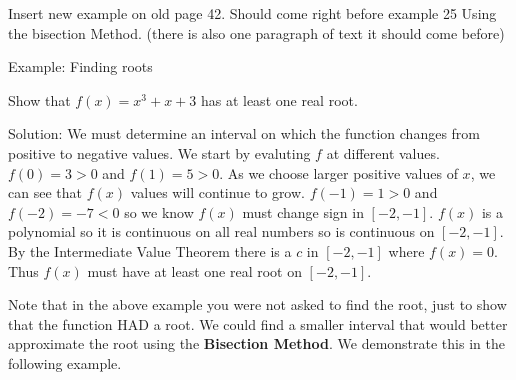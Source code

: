 \documentclass[10pt]{article}
\begin{document}
Insert new example on old page 42. Should come right before example 25 Using the bisection Method. (there is also one paragraph of text it should come before)

Example:  Finding roots

Show that $f(x)=x^3+x+3$ has at least one real root.

Solution:  We must determine an interval on which the function changes from positive to negative values. We start by evaluting $f$ at different values. $f(0)=3>0$ and $f(1)=5>0$. As we choose larger positive values of $x$, we can see that $f(x)$ values will continue to grow. $f(-1)=1>0$ and $f(-2)=-7<0$ so we know $f(x)$ must change sign in $[-2,-1]$.  $f(x)$ is a polynomial so it is continuous on all real numbers so is continuous on $[-2,-1]$. By the Intermediate Value Theorem there is a $c$ in $[-2,-1]$ where $f(x)=0$. Thus $f(x)$ must have at least one real root on $[-2,-1]$.  


Note that in the above example you were not asked to find the root, just to show that the function HAD a root. We could find a smaller interval that would better approximate the root using the \textbf{Bisection Method}. We demonstrate this in the following example.
\end{document}
